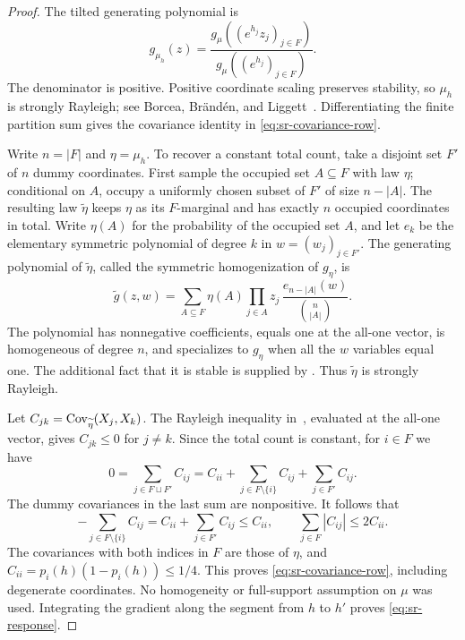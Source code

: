\begin{proof}
The tilted generating polynomial is
\[
 g_{\mu_h}(z)
 =\frac{g_\mu((e^{h_j}z_j)_{j\in F})}
        {g_\mu((e^{h_j})_{j\in F})}.
\]
The denominator is positive. Positive coordinate scaling preserves
stability, so $\mu_h$ is strongly Rayleigh; see
Borcea, Br\"and\'en, and Liggett~\cite[Section~2.1(iv) and Proposition~3.1(2)]{BorceaBrandenLiggett2009}.
Differentiating the finite partition sum gives the covariance identity in
\eqref{eq:sr-covariance-row}.

Write $n=|F|$ and $\eta=\mu_h$. To recover a constant total count, take a
disjoint set $F'$ of $n$ dummy coordinates. First sample the occupied set
$A\subseteq F$ with law $\eta$; conditional on $A$, occupy a uniformly
chosen subset of $F'$ of size $n-|A|$. The resulting law
$\widetilde\eta$ keeps $\eta$ as its $F$-marginal and has exactly $n$
occupied coordinates in total. Write $\eta(A)$ for the probability of the
occupied set $A$, and let $e_k$ be the elementary symmetric polynomial
of degree $k$ in $w=(w_j)_{j\in F'}$. The generating polynomial of
$\widetilde\eta$, called the symmetric homogenization of $g_\eta$, is
\[
 \widetilde g(z,w)
 =\sum_{A\subseteq F}\eta(A)\prod_{j\in A}z_j\,
       \frac{e_{n-|A|}(w)}{\binom{n}{|A|}}.
\]
The polynomial has nonnegative coefficients, equals one at the
all-one vector, is homogeneous of degree $n$, and specializes to $g_\eta$
when all the $w$ variables equal one. The additional fact that it is stable
is supplied by
\cite[Definition~2.12 and Theorem~4.2]{BorceaBrandenLiggett2009}.
Thus $\widetilde\eta$ is strongly Rayleigh.

Let $C_{jk}=\operatorname{Cov}_{\widetilde\eta}(X_j,X_k)$. The Rayleigh inequality
in~\cite[Theorem~4.1]{BorceaBrandenLiggett2009}, evaluated at the all-one
vector, gives $C_{jk}\le0$ for $j\ne k$. Since the total count is constant,
for $i\in F$ we have
\[
 0=\sum_{j\in F\sqcup F'}C_{ij}
  =C_{ii}+\sum_{j\in F\setminus\{i\}}C_{ij}
            +\sum_{j\in F'}C_{ij}.
\]
The dummy covariances in the last sum are nonpositive. It follows that
\[
 -\sum_{j\in F\setminus\{i\}}C_{ij}
 =C_{ii}+\sum_{j\in F'}C_{ij}\le C_{ii},
 \qquad
 \sum_{j\in F}|C_{ij}|\le2C_{ii}.
\]
The covariances with both indices in $F$ are those of $\eta$, and
$C_{ii}=p_i(h)(1-p_i(h))\le1/4$. This proves
\eqref{eq:sr-covariance-row}, including degenerate coordinates. No
homogeneity or full-support assumption on $\mu$ was used. Integrating the
gradient along the segment from $h$ to $h'$ proves \eqref{eq:sr-response}.
\end{proof}

